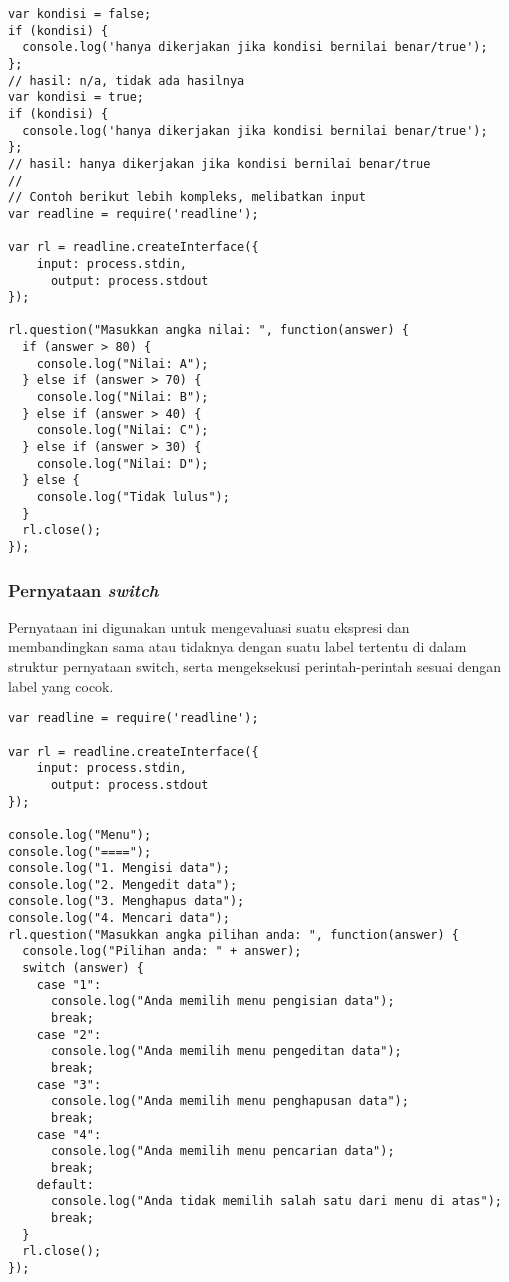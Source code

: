\begin{lstlisting}
var kondisi = false;
if (kondisi) {
  console.log('hanya dikerjakan jika kondisi bernilai benar/true');
};
// hasil: n/a, tidak ada hasilnya
var kondisi = true;
if (kondisi) {
  console.log('hanya dikerjakan jika kondisi bernilai benar/true');
};
// hasil: hanya dikerjakan jika kondisi bernilai benar/true
//
// Contoh berikut lebih kompleks, melibatkan input
var readline = require('readline');

var rl = readline.createInterface({
    input: process.stdin,
      output: process.stdout
});

rl.question("Masukkan angka nilai: ", function(answer) {
  if (answer > 80) {
    console.log("Nilai: A");
  } else if (answer > 70) {
    console.log("Nilai: B");
  } else if (answer > 40) {
    console.log("Nilai: C");
  } else if (answer > 30) {
    console.log("Nilai: D");
  } else {
    console.log("Tidak lulus");
  }
  rl.close();
});
\end{lstlisting}

\subsubsection{Pernyataan \textit{switch}}

Pernyataan ini digunakan untuk mengevaluasi suatu ekspresi dan membandingkan sama atau tidaknya dengan suatu label tertentu di dalam struktur pernyataan switch, serta mengeksekusi perintah-perintah sesuai dengan label yang cocok.

\begin{lstlisting}
var readline = require('readline');

var rl = readline.createInterface({
    input: process.stdin,
      output: process.stdout
});

console.log("Menu");
console.log("====");
console.log("1. Mengisi data");
console.log("2. Mengedit data");
console.log("3. Menghapus data");
console.log("4. Mencari data");
rl.question("Masukkan angka pilihan anda: ", function(answer) {
  console.log("Pilihan anda: " + answer);
  switch (answer) {
    case "1":
      console.log("Anda memilih menu pengisian data");
      break;
    case "2":
      console.log("Anda memilih menu pengeditan data");
      break;
    case "3":
      console.log("Anda memilih menu penghapusan data");
      break;
    case "4":
      console.log("Anda memilih menu pencarian data");
      break;
    default:
      console.log("Anda tidak memilih salah satu dari menu di atas");
      break;
  }
  rl.close();
});
\end{lstlisting}



